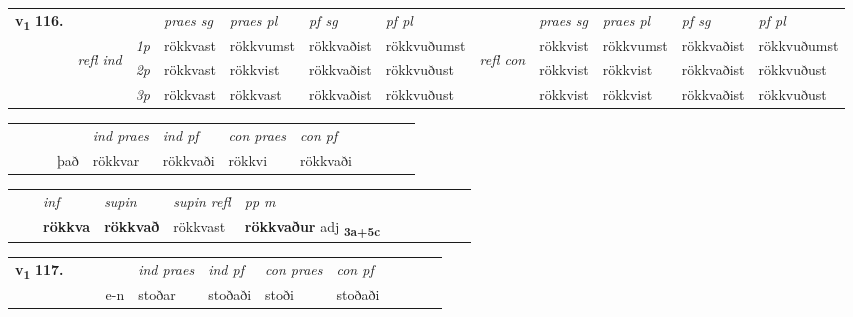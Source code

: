\begin{tabular}{llllllllllll} \toprule
\multirow{4}{*}{{{\textbf{v{\textsubscript{1}}} \Large{\textbf{116.}}}}}  & &   &  \textit{praes sg}  & \textit{praes pl}  &\textit{pf sg} & \textit{pf pl} &  &  \textit{praes sg}  & \textit{praes pl}  & \textit{pf sg} & \textit{pf pl } \\*
	\cmidrule{4-7} \cmidrule{9-12}
 &\multirow{3}{*}{\begin{turn}{90}\textit{refl ind}\end{turn}} & {\textit{1p}} & rökkvast & rökkvumst    & rökkvaðist & rökkvuðumst & \multirow{3}{*}{\begin{turn}{90}\textit{refl con}\end{turn}}  &rökkvist & rökkvumst & rökkvaðist & rökkvuðumst\\*
 &&  {\textit{2p}} &  rökkvast  & rökkvist   & rökkvaðist & rökkvuðust & &rökkvist & rökkvist & rökkvaðist & rökkvuðust \\*
& &  {\textit{3p}} & rökkvast & rökkvast   & rökkvaðist & rökkvuðust & & rökkvist & rökkvist& rökkvaðist & rökkvuðust  \\*
\cmidrule{4-7} \cmidrule{9-12}
\end{tabular}


\begin{tabular}{llllllllllll}
 & &  & &  \textit{ind praes} & \textit{ind pf} & \textit{con praes} & \textit{con pf} \\*
&  & & það & rökkvar & rökkvaði & rökkvi & rökkvaði \\*
\cmidrule{5-9}
\end{tabular}


\begin{tabular}{llllllllllll}
 & & \textit{inf}      & \textit{supin} & \textit{supin refl} & \textit{pp m}     \\*
  & & \textbf{rökkva}       &  \textbf{rökkvað} & rökkvast & \textbf{rökkvaður} adj \textbf{\textsubscript{3a+5c}} \\*
\cmidrule{1-12}
\end{tabular}





\begin{tabular}{llllllllllll}\toprule
\multirow{4}{*}{{{\textbf{v{\textsubscript{1}}} \Large{\textbf{117.}}}}}  & &  & &  \textit{ind praes} & \textit{ind pf} & \textit{con praes} & \textit{con pf} \\*
&  & & e-n & stoðar & stoðaði & stoði & stoðaði \\*
\cmidrule{5-9}
\end{tabular}


